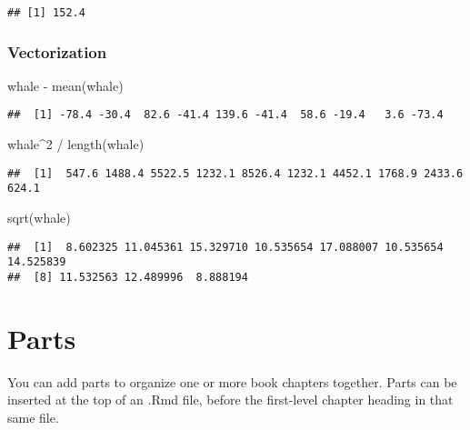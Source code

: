 \documentclass[
]{book}
\newenvironment{Shaded}{\begin{snugshade}}{\end{snugshade}}
\newcommand{\DecValTok}[1]{\textcolor[rgb]{0.00,0.00,0.81}{#1}}
\newcommand{\FunctionTok}[1]{\textcolor[rgb]{0.00,0.00,0.00}{#1}}
\newcommand{\NormalTok}[1]{#1}
\newcommand{\SpecialCharTok}[1]{\textcolor[rgb]{0.00,0.00,0.00}{#1}}
\theoremstyle{definition}
\theoremstyle{definition}
\theoremstyle{definition}
\theoremstyle{definition}
\theoremstyle{remark}
\begin{document}
\begin{verbatim}
## [1] 152.4
\end{verbatim}

\hypertarget{vectorization}{%
\subsection{Vectorization}\label{vectorization}}

\begin{Shaded}
\begin{Highlighting}[]
\NormalTok{whale }\SpecialCharTok{{-}} \FunctionTok{mean}\NormalTok{(whale)}
\end{Highlighting}
\end{Shaded}

\begin{verbatim}
##  [1] -78.4 -30.4  82.6 -41.4 139.6 -41.4  58.6 -19.4   3.6 -73.4
\end{verbatim}

\begin{Shaded}
\begin{Highlighting}[]
\NormalTok{whale}\SpecialCharTok{\^{}}\DecValTok{2} \SpecialCharTok{/} \FunctionTok{length}\NormalTok{(whale)}
\end{Highlighting}
\end{Shaded}

\begin{verbatim}
##  [1]  547.6 1488.4 5522.5 1232.1 8526.4 1232.1 4452.1 1768.9 2433.6  624.1
\end{verbatim}

\begin{Shaded}
\begin{Highlighting}[]
\FunctionTok{sqrt}\NormalTok{(whale)}
\end{Highlighting}
\end{Shaded}

\begin{verbatim}
##  [1]  8.602325 11.045361 15.329710 10.535654 17.088007 10.535654 14.525839
##  [8] 11.532563 12.489996  8.888194
\end{verbatim}

\hypertarget{parts}{%
\chapter{Parts}\label{parts}}

You can add parts to organize one or more book chapters together. Parts can be inserted at the top of an .Rmd file, before the first-level chapter heading in that same file.
\end{document}
